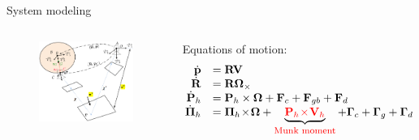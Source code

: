 \documentclass{beamer}
\begin{document}
\begin{frame}{System modeling}
	\begin{columns}
		\begin{figure}
			\includegraphics[width = 55mm]{Images/Notation_rot_modif3.png}
		\end{figure}
		\begin{block}{Equations of motion:}
			\scriptsize \vspace{-0.4cm}
			\begin{equation*}\label{eq:system2}
			\begin{array}{rl}
			\dot{\mathbf{p}} & =  \mathbf{R} \mathbf{V} \\
			\dot{\mathbf{R}} & =  \mathbf{R} \mathbf{\Omega}_\times \\
			\!\!\dot{\mathbf{P}}_h &= \mathbf{P}_h \times \mathbf{\Omega} +\mathbf{F}_c + \mathbf{F}_{gb} + \mathbf{F}_d  \\
			\!\!\dot{\mathbf{\Pi}}_h &=  \mathbf{\Pi}_h \!\times\! \mathbf{\mathbf{\Omega}} + \underbrace{{\color{red}\mathbf{P}_h \!\times \!\mathbf{V}_h}}_{\color{red} \text{{\footnotesize Munk moment}}}  +\mathbf{\Gamma}_c + \mathbf{\Gamma}_g + \mathbf{\Gamma}_d \!\!\vspace{-0.2cm}
			\end{array}
			\end{equation*} \vspace{-0.3cm}

\end{block}
\end{columns}
\end{frame}
\end{document}
